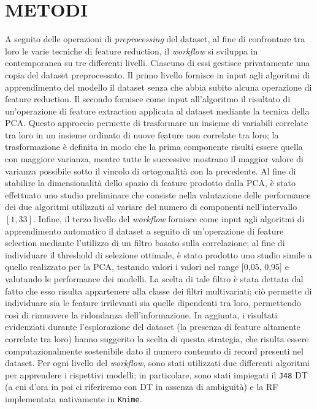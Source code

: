 \section{METODI}
A seguito delle operazioni di \textit{preprocessing} del dataset, al fine di confrontare tra loro le varie tecniche di feature reduction, il \textit{workflow} si sviluppa in contemporanea su tre differenti livelli.
Ciascuno di essi gestisce privatamente una copia del dataset preprocessato.
Il primo livello fornisce in input agli algoritmi di apprendimento del modello il dataset senza che abbia subito alcuna operazione di feature reduction.
Il secondo fornisce come input all'algoritmo il risultato di un'operazione di feature extraction applicata al dataset mediante la tecnica della PCA. Questo approccio permette di trasformare un insieme di variabili correlate tra loro in un insieme ordinato di nuove feature non correlate tra loro; la trasformazione è definita in modo che la prima componente risulti essere quella con maggiore varianza, mentre tutte le successive mostrano il maggior valore di varianza possibile sotto il vincolo di ortogonalità con la precedente.
Al fine di stabilire la dimensionalità dello spazio di feature prodotto dalla PCA, è stato effettuato uno studio preliminare che consiste nella valutazione delle performance dei due algoritmi utilizzati al variare del numero di componenti nell'intervallo $[1, 33]$.
Infine, il terzo livello del \textit{workflow} fornisce come input agli algoritmi di apprendimento automatico il dataset a seguito di un'operazione di feature selection mediante l'utilizzo di un filtro basato sulla correlazione; al fine di individuare il threshold di selezione ottimale, è stato prodotto uno studio simile a quello realizzato per la PCA, testando valori i valori nel range [0,05, 0,95] e valutando le performance dei modelli.
La scelta di tale filtro è stata dettata dal fatto che esso risulta appartenere alla classe dei filtri multivariati; ciò permette di individuare sia le feature irrilevanti sia quelle dipendenti tra loro, permettendo così di rimuovere la ridondanza dell'informazione. 
In aggiunta, i risultati evidenziati durante l'esplorazione del dataset (la presenza di feature altamente correlate tra loro) hanno suggerito la scelta di questa strategia, che risulta essere computazionalmente sostenibile dato il numero contenuto di record presenti nel dataset.
Per ogni livello del \textit{workflow}, sono stati utilizzati due differenti algoritmi per apprendere i rispettivi modelli; in particolare, sono stati impiegati il \texttt{J48} DT (a cui d'ora in poi ci riferiremo con DT in assenza di ambiguità) e la RF implementata nativamente in \texttt{Knime}.
